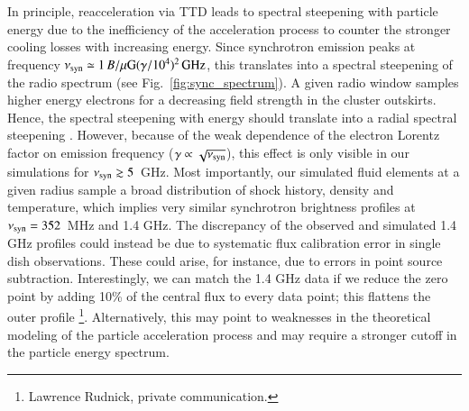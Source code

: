 \documentclass[useAMS,usenatbib]{mn2e}
\begin{document}
In principle, reacceleration via TTD leads to spectral steepening with
particle energy due to the inefficiency of the acceleration process to
counter the stronger cooling losses with increasing energy. Since
synchrotron emission peaks at frequency $\nu_{\mathrm{syn}}\simeq 1\,
B/\mu{\mathrm{G}} (\gamma/10^4)^2\,{\mathrm{GHz}}$, this translates into a
spectral steepening of the radio spectrum (see
Fig.~\ref{fig:sync_spectrum}). A given radio window samples higher
energy electrons for a decreasing field strength in the cluster
outskirts. Hence, the spectral steepening with energy should translate
into a radial spectral steepening \citep{brunetti12}. However, because
of the weak dependence of the electron Lorentz factor on emission
frequency ($\gamma\propto\sqrt{\nu_{\mathrm{syn}}}$), this effect is only
visible in our simulations for $\nu_{\mathrm{syn}}\gtrsim5$~GHz. Most
importantly, our simulated fluid elements at a given radius sample a
broad distribution of shock history, density and temperature, which
implies very similar synchrotron brightness profiles at
$\nu_{\mathrm{syn}}=352$~MHz and 1.4 GHz. The discrepancy of the observed
and simulated 1.4 GHz profiles could instead be due to systematic flux
calibration error in single dish observations. These could arise, for
instance, due to errors in point source subtraction. Interestingly, we
can match the 1.4 GHz data if we reduce the zero point by adding 10\%
of the central flux to every data point; this flattens the outer
profile \footnote{Lawrence Rudnick, private communication.}.
Alternatively, this may point to weaknesses in the theoretical
modeling of the particle acceleration process and may require a
stronger cutoff in the particle energy spectrum.
\end{document}
